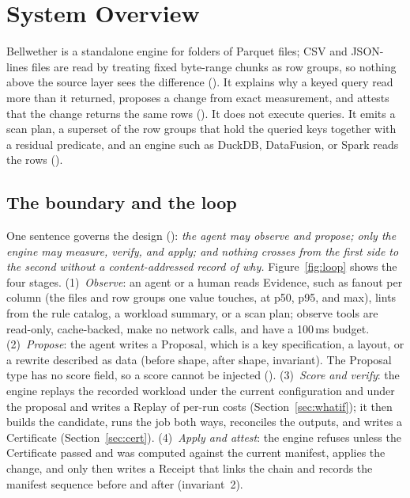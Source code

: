 \section{System Overview}\label{sec:overview}

Bellwether is a standalone engine for folders of Parquet files; CSV and
JSON-lines files are read by treating fixed byte-range chunks as row groups, so
nothing above the source layer sees the difference (). It
explains why a keyed query read more than it returned, proposes a change from
exact measurement, and attests that the change returns the same rows
(). It does not execute queries. It emits a scan plan, a
superset of the row groups that hold the queried keys together with a residual
predicate, and an engine such as DuckDB, DataFusion, or Spark reads the rows
().

\subsection{The boundary and the loop}\label{sec:loop}

One sentence governs the design (): \emph{the agent may
observe and propose; only the engine may measure, verify, and apply; and
nothing crosses from the first side to the second without a content-addressed
record of why.} Figure~\ref{fig:loop} shows the four stages.
(1)~\emph{Observe}: an agent or a human reads Evidence, such as fanout per
column (the files and row groups one value touches, at p50, p95, and max),
lints from the rule catalog, a workload summary, or a scan plan; observe tools
are read-only, cache-backed, make no network calls, and have a 100\,ms budget.
(2)~\emph{Propose}: the agent writes a Proposal, which is a key specification,
a layout, or a rewrite described as data (before shape, after shape, invariant).
The Proposal type has no score field, so a score cannot be injected
(). (3)~\emph{Score and verify}: the engine replays the
recorded workload under the current configuration and under the proposal and
writes a Replay of per-run costs (Section~\ref{sec:whatif}); it then builds the
candidate, runs the job both ways, reconciles the outputs, and writes a
Certificate (Section~\ref{sec:cert}). (4)~\emph{Apply and attest}: the engine
refuses unless the Certificate passed and was computed against the current
manifest, applies the change, and only then writes a Receipt that links the
chain and records the manifest sequence before and after (invariant~2).

